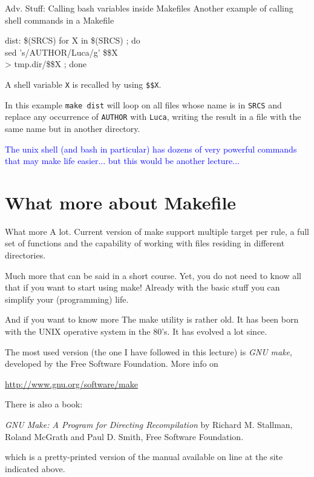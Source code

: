 \documentclass[10pt,aspectratio=169]{beamer}
\begin{document}
\begin{frame}{Adv. Stuff: Calling bash variables inside Makefiles}
Another example of calling shell commands in a Makefile
\begin{semiverbatim}
dist: \$(SRCS)\newline
\phantom{xx} for X in \$(SRCS) ; do \\ \newline
                 sed 's/AUTHOR/Luca/g' \$\$X \\ \newline
                 > tmp.dir/\$\$X ; done \newline
\end{semiverbatim}
A shell variable \texttt{X} is recalled by using \texttt{\$\$X}.
\medskip

In this example \texttt{make dist} will loop on all files whose name is in \texttt{SRCS} and replace any occurrence of 
\texttt{AUTHOR} with \texttt{Luca}, writing the result in a file with the same name but in another directory. 
\medskip

\textcolor{blue}{The unix shell (and bash in particular) has dozens of very powerful commands that may make life easier... 
but this would be another lecture...}


\end{frame}


\section*{What more about Makefile}

\begin{frame}{What more} A lot. Current version of make support
  \alert{multiple target per rule}, a full
  set of \alert{functions} and the capability of working with files
  residing in different directories.  
\smallskip

Much more that can be said in a short course. Yet, you do not need to
know all that if you want to start using make! Already with the basic
stuff you can simplify your (programming) life.
\end{frame}


\begin{frame}{And if you want to know more}
The make utility is rather old. It has been born with the UNIX operative
system in the 80's. It has evolved a lot since. 

The most used version (the one I have followed in this lecture) is \emph{GNU make}, developed by the Free Software Foundation. More info on

\href{http://www.gnu.org/software/make}{http://www.gnu.org/software/make}
\medskip

There is also a book:
\smallskip

\emph{GNU Make: A Program for Directing Recompilation}
by Richard M. Stallman, Roland McGrath and Paul D. Smith, Free Software
Foundation.
\smallskip

which is a pretty-printed version of the manual available on line at the
site indicated above.
\end{frame}
\end{document}
